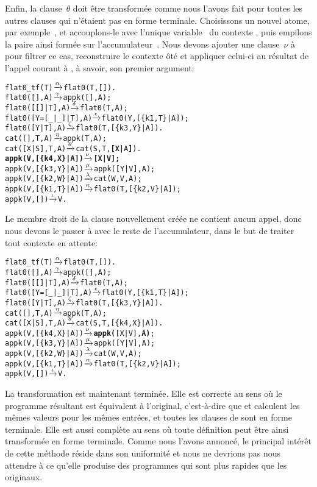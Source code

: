 Enfin, la clause~\(\theta\) doit être transformée comme nous l'avons
fait pour toutes les autres clauses qui n'étaient pas en forme
terminale. Choisissons un nouvel atome, par exemple~, et
accouplons-le avec l'unique variable~ du contexte
\erlcode{[Y|\textvisiblespace]}, puis empilons la paire ainsi formée
sur l'accumulateur~. Nous devons ajouter une clause~\(\nu\)
à  pour filtrer ce cas, reconstruire le contexte ôté
et appliquer celui-ci au résultat de l'appel courant à
, à savoir, son premier argument:
\begin{alltt}
flat0\_tf(T)          \(\smashedrightarrow{\alpha}\) flat0(T,[]).
flat0(         [],A) \(\smashedrightarrow{\gamma}\) appk([],A);
flat0(     [[]|T],A) \(\smashedrightarrow{\delta}\) flat0(T,A);
flat0([Y=[\_|\_]|T],A) \(\smashedrightarrow{\epsilon}\) flat0(Y,[\{k1,T\}|A]);
flat0(      [Y|T],A) \(\smashedrightarrow{\zeta}\) flat0(T,[\{k3,Y\}|A]).
cat(   [],T,A)       \(\smashedrightarrow{\eta}\) appk(T,A);
cat([X|S],T,A)       \(\smashedrightarrow{\theta}\) cat(S,T,\textbf{[X|}A\textbf{]}).
\textbf{appk(V,[\{k4,X\}|A])   \(\smashedrightarrow{\nu}\) [X|V];}\hfill% A \emph{inutile pour le moment}
appk(V,[\{k3,Y\}|A])   \(\smashedrightarrow{\mu}\) appk([Y|V],A);
appk(V,[\{k2,W\}|A])   \(\smashedrightarrow{\lambda}\) cat(W,V,A);
appk(V,[\{k1,T\}|A])   \(\smashedrightarrow{\kappa}\) flat0(T,[\{k2,V\}|A]);
appk(V,        [])   \(\smashedrightarrow{\iota}\) V.
\end{alltt}
Le membre droit de la clause nouvellement créée ne contient aucun
appel, donc nous devons le passer à
 avec le reste de l'accumulateur, dans le but de
traiter tout contexte en attente:
\begin{alltt}
flat0\_tf(T)          \(\smashedrightarrow{\alpha}\) flat0(T,[]).
flat0(         [],A) \(\smashedrightarrow{\gamma}\) appk([],A);
flat0(     [[]|T],A) \(\smashedrightarrow{\delta}\) flat0(T,A);
flat0([Y=[\_|\_]|T],A) \(\smashedrightarrow{\epsilon}\) flat0(Y,[\{k1,T\}|A]);
flat0(      [Y|T],A) \(\smashedrightarrow{\zeta}\) flat0(T,[\{k3,Y\}|A]).
cat(   [],T,A)       \(\smashedrightarrow{\eta}\) appk(T,A);
cat([X|S],T,A)       \(\smashedrightarrow{\theta}\) cat(S,T,[\{k4,X\}|A]).
appk(V,[\{k4,X\}|A])   \(\smashedrightarrow{\nu}\) \textbf{appk(}[X|V],\textbf{A)};
appk(V,[\{k3,Y\}|A])   \(\smashedrightarrow{\mu}\) appk([Y|V],A);
appk(V,[\{k2,W\}|A])   \(\smashedrightarrow{\lambda}\) cat(W,V,A);
appk(V,[\{k1,T\}|A])   \(\smashedrightarrow{\kappa}\) flat0(T,[\{k2,V\}|A]);
appk(V,        [])   \(\smashedrightarrow{\iota}\) V.
\end{alltt}
La transformation est maintenant terminée. Elle est correcte au sens
où le programme résultant est équivalent à l'original, c'est-à-dire
que  et  calculent les mêmes
valeurs pour les mêmes entrées, et toutes les clauses de
 sont en forme terminale. Elle est aussi complète
au sens où toute définition peut être ainsi transformée en forme
terminale. Comme nous l'avons annoncé, le principal intérêt de cette
méthode réside dans son uniformité et nous ne devrions pas nous
attendre à ce qu'elle produise des programmes qui sont plus rapides
que les originaux.

